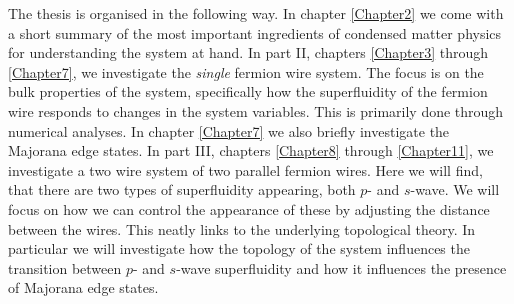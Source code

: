 The thesis is organised in the following way. In chapter \ref{Chapter2} we come with a short summary of the most important ingredients of condensed matter physics for understanding the system at hand. In part II, chapters \ref{Chapter3} through \ref{Chapter7}, we investigate the \textit{single} fermion wire system. The focus is on the bulk properties of the system, specifically how the superfluidity of the fermion wire responds to changes in the system variables. This is primarily done through numerical analyses. In chapter \ref{Chapter7} we also briefly investigate the Majorana edge states. In part III, chapters \ref{Chapter8} through \ref{Chapter11}, we investigate a two wire system of two parallel fermion wires. Here we will find, that there are two types of superfluidity appearing, both $p$- and $s$-wave. We will focus on how we can control the appearance of these by adjusting the distance between the wires. This neatly links to the underlying topological theory. In particular we will investigate how the topology of the system influences the transition between $p$- and $s$-wave superfluidity and how it influences the presence of Majorana edge states. 